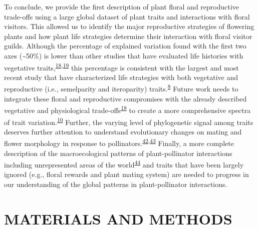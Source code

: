 \documentclass[
  12pt,
  a4paper,
]{article}
\begin{document}
To conclude, we provide the first description of plant floral and reproductive trade-offs using a large global dataset of plant traits and interactions with floral visitors. This allowed us to identify the major reproductive strategies of flowering plants and how plant life strategies determine their interaction with floral visitor guilds. Although the percentage of explained variation found with the first two axes (\textasciitilde50\%) is lower than other studies that have evaluated life histories with vegetative traits,\textsuperscript{\protect\hyperlink{ref-diaz2016}{18},\protect\hyperlink{ref-carmona2021}{19}} this percentage is consistent with the largest and most recent study that have characterized life strategies with both vegetative and reproductive (i.e., semelparity and iteroparity) traits.\textsuperscript{\protect\hyperlink{ref-salguero2016}{8}} Future work needs to integrate these floral and reproductive compromises with the already described vegetative and physiological trade-offs\textsuperscript{\protect\hyperlink{ref-diaz2016}{18}} to create a more comprehensive spectra of trait variation.\textsuperscript{\protect\hyperlink{ref-roddy2021}{10}} Further, the varying level of phylogenetic signal among traits deserves further attention to understand evolutionary changes on mating and flower morphology in response to pollinators.\textsuperscript{\protect\hyperlink{ref-gervasi2017}{42},\protect\hyperlink{ref-mackin2021}{43}} Finally, a more complete description of the macroecological patterns of plant-pollinator interactions including unrepresented areas of the world\textsuperscript{\protect\hyperlink{ref-poisot2021}{44}} and traits that have been largely ignored (e.g., floral rewards and plant mating system) are needed to progress in our understanding of the global patterns in plant-pollinator interactions.

\hypertarget{materials-and-methods}{%
\section{MATERIALS AND METHODS}\label{materials-and-methods}}
\end{document}
